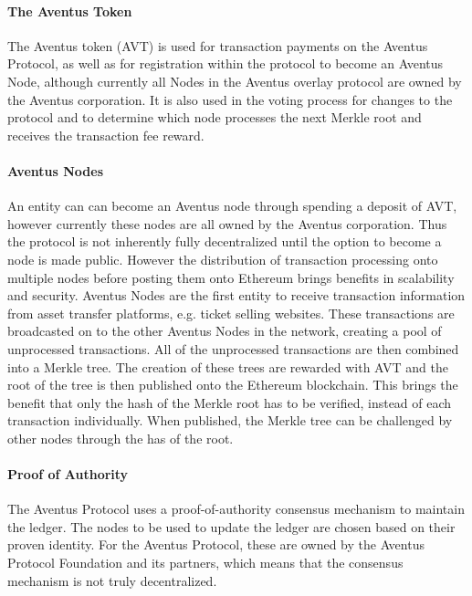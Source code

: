 \paragraph{The Aventus Token}

The Aventus token (AVT) is used for transaction payments on the Aventus Protocol, as well as for registration within the protocol to become an Aventus Node, although currently all Nodes in the Aventus overlay protocol are owned by the Aventus corporation. It is also used in the voting process for changes to the protocol and to determine which node processes the next Merkle root and receives the transaction fee reward.

\paragraph{Aventus Nodes}\label{subsection:aventus nodes}

 An entity can can become an Aventus node through spending a deposit of AVT, however currently these nodes are all owned by the Aventus corporation. Thus the protocol is not inherently fully decentralized until the option to become a node is made public. However the distribution of transaction processing onto multiple nodes before posting them onto Ethereum brings benefits in scalability and security.
 Aventus Nodes are the first entity to receive transaction information from asset transfer platforms, e.g. ticket selling websites. These transactions are broadcasted on to the other Aventus Nodes in the network, creating a pool of unprocessed transactions. All of the unprocessed transactions are then combined into a Merkle tree. The creation of these trees are rewarded with AVT and the root of the tree is then published onto the Ethereum blockchain. This brings the benefit that only the hash of the Merkle root has to be verified, instead of each transaction individually. When published, the Merkle tree can be challenged by other nodes through the has of the root.

\paragraph{Proof of Authority}

The Aventus Protocol uses a proof-of-authority consensus mechanism to maintain the ledger. The nodes to be used to update the ledger are chosen based on their proven identity. For the Aventus Protocol, these are owned by the Aventus Protocol Foundation and its partners, which means that the consensus mechanism is not truly decentralized. 

